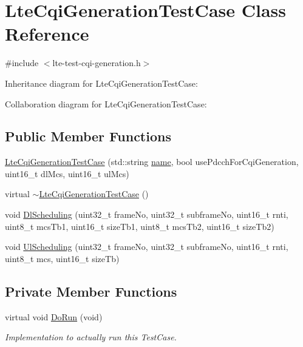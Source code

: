 \hypertarget{classLteCqiGenerationTestCase}{}\section{Lte\+Cqi\+Generation\+Test\+Case Class Reference}
\label{classLteCqiGenerationTestCase}


{\ttfamily \#include $<$lte-\/test-\/cqi-\/generation.\+h$>$}



Inheritance diagram for Lte\+Cqi\+Generation\+Test\+Case\+:


Collaboration diagram for Lte\+Cqi\+Generation\+Test\+Case\+:
\subsection*{Public Member Functions}
\begin{DoxyCompactItemize}
\item 
\hyperlink{classLteCqiGenerationTestCase_aeec158fe49cdfc3d4f9ba08522c2a5f7}{Lte\+Cqi\+Generation\+Test\+Case} (std\+::string \hyperlink{generate__test__data__lte__spectrum__model_8m_ab74e6bf80237ddc4109968cedc58c151}{name}, bool use\+Pdcch\+For\+Cqi\+Generation, uint16\+\_\+t dl\+Mcs, uint16\+\_\+t ul\+Mcs)
\item 
virtual \hyperlink{classLteCqiGenerationTestCase_adfacd401257b882b1f0f1b6f100f0f28}{$\sim$\+Lte\+Cqi\+Generation\+Test\+Case} ()
\item 
void \hyperlink{classLteCqiGenerationTestCase_ad4339c2db8e54033fd3c22ada80e658f}{Dl\+Scheduling} (uint32\+\_\+t frame\+No, uint32\+\_\+t subframe\+No, uint16\+\_\+t rnti, uint8\+\_\+t mcs\+Tb1, uint16\+\_\+t size\+Tb1, uint8\+\_\+t mcs\+Tb2, uint16\+\_\+t size\+Tb2)
\item 
void \hyperlink{classLteCqiGenerationTestCase_a31da98479e7b903b789ce7e8d0398fa1}{Ul\+Scheduling} (uint32\+\_\+t frame\+No, uint32\+\_\+t subframe\+No, uint16\+\_\+t rnti, uint8\+\_\+t mcs, uint16\+\_\+t size\+Tb)
\end{DoxyCompactItemize}
\subsection*{Private Member Functions}
\begin{DoxyCompactItemize}
\item 
virtual void \hyperlink{classLteCqiGenerationTestCase_a263a0f3670c23e42ed3feb7d353bdd09}{Do\+Run} (void)
\begin{DoxyCompactList}\small\item\em Implementation to actually run this Test\+Case. \end{DoxyCompactList}\end{DoxyCompactItemize}
